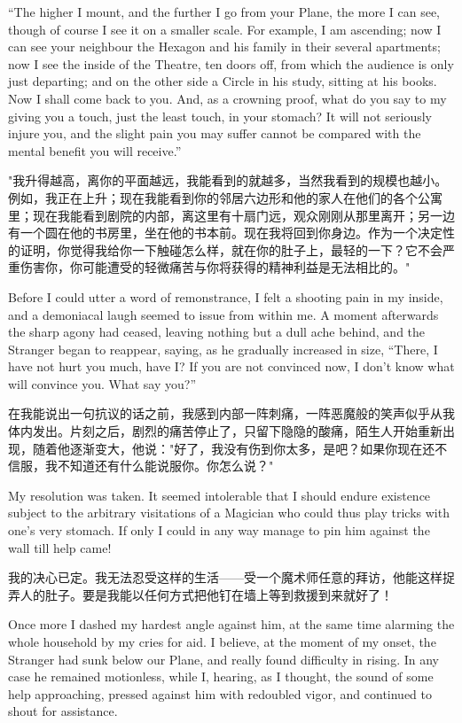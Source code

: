 \documentclass[12pt,UTF8]{ctexbook}
\begin{document}
``The higher I mount, and the further I go from your Plane, the more I can see, though of course I see it on a smaller scale. For example, I am ascending; now I can see your neighbour the Hexagon and his family in their several apartments; now I see the inside of the Theatre, ten doors off, from which the audience is only just departing; and on the other side a Circle in his study, sitting at his books. Now I shall come back to you. And, as a crowning proof, what do you say to my giving you a touch, just the least touch, in your stomach? It will not seriously injure you, and the slight pain you may suffer cannot be compared with the mental benefit you will receive.''

"我升得越高，离你的平面越远，我能看到的就越多，当然我看到的规模也越小。例如，我正在上升；现在我能看到你的邻居六边形和他的家人在他们的各个公寓里；现在我能看到剧院的内部，离这里有十扇门远，观众刚刚从那里离开；另一边有一个圆在他的书房里，坐在他的书本前。现在我将回到你身边。作为一个决定性的证明，你觉得我给你一下触碰怎么样，就在你的肚子上，最轻的一下？它不会严重伤害你，你可能遭受的轻微痛苦与你将获得的精神利益是无法相比的。"

Before I could utter a word of remonstrance, I felt a shooting pain in my inside, and a demoniacal laugh seemed to issue from within me. A moment afterwards the sharp agony had ceased, leaving nothing but a dull ache behind, and the Stranger began to reappear, saying, as he gradually increased in size, ``There, I have not hurt you much, have I? If you are not convinced now, I don't know what will convince you. What say you?''

在我能说出一句抗议的话之前，我感到内部一阵刺痛，一阵恶魔般的笑声似乎从我体内发出。片刻之后，剧烈的痛苦停止了，只留下隐隐的酸痛，陌生人开始重新出现，随着他逐渐变大，他说："好了，我没有伤到你太多，是吧？如果你现在还不信服，我不知道还有什么能说服你。你怎么说？"

My resolution was taken. It seemed intolerable that I should endure existence subject to the arbitrary visitations of a Magician who could thus play tricks with one's very stomach. If only I could in any way manage to pin him against the wall till help came!

我的决心已定。我无法忍受这样的生活——受一个魔术师任意的拜访，他能这样捉弄人的肚子。要是我能以任何方式把他钉在墙上等到救援到来就好了！

Once more I dashed my hardest angle against him, at the same time alarming the whole household by my cries for aid. I believe, at the moment of my onset, the Stranger had sunk below our Plane, and really found difficulty in rising. In any case he remained motionless, while I, hearing, as I thought, the sound of some help approaching, pressed against him with redoubled vigor, and continued to shout for assistance.
\end{document}
